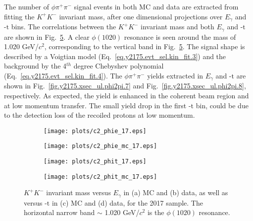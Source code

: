 The number of $\phi \pi^{+} \pi^{-}$ signal events in both MC and data are extracted from fitting the $K^+K^-$ invariant mass, after one dimensional projections over $E_{\gamma}$ and $\mbox{-t}$ bins. The correlations between the $K^+K^-$ invariant mass and both $E_{\gamma}$ and $\mbox{-t}$ are shown in Fig.~\ref{fig.y2175.xsec_ul.phi2pi.2}. A clear $\phi(1020)$ resonance is seen around the mass of 1.020 GeV/$c^2$, corresponding to the vertical band in Fig.~\ref{fig.y2175.xsec_ul.phi2pi.2}. The signal shape is described by a Voigtian model (Eq.~\ref{eq.y2175.evt_sel.kin_fit.3}) and the background by the 4$^{th}$ degree Chebyshev polynomial (Eq.~\ref{eq.y2175.evt_sel.kin_fit.4}). The $\phi \pi^{+} \pi^{-}$ yields extracted in $E_{\gamma}$ and $\mbox{-t}$ are shown in Fig.~\ref{fig.y2175.xsec_ul.phi2pi.7} and Fig.~\ref{fig.y2175.xsec_ul.phi2pi.8}, respectively. As expected, the yield is enhanced in the coherent beam region and at low momentum transfer. The small yield drop in the first $\mbox{-t}$ bin, could be due to the detection loss of the recoiled protons at low momentum. 

\begin{figure}[H]
    \centering
    \begin{subfigure}[b]{0.5\textwidth}
        \texttt{[image: plots/c2\_phie\_17.eps]}
        \caption{}
        \label{fig.y2175.xsec_ul.phi2pi.2.a}
    \end{subfigure}\hfill
    \begin{subfigure}[b]{0.5\textwidth}
        \texttt{[image: plots/c2\_phie\_mc\_17.eps]}
        \caption{}
        \label{fig.y2175.xsec_ul.phi2pi.2.b}
    \end{subfigure}
    \begin{subfigure}[b]{0.5\textwidth}
        \texttt{[image: plots/c2\_phit\_17.eps]}
        \caption{}
        \label{fig.y2175.xsec_ul.phi2pi.2.c}
    \end{subfigure}\hfill
    \begin{subfigure}[b]{0.5\textwidth}
        \texttt{[image: plots/c2\_phit\_mc\_17.eps]}
        \caption{}
        \label{fig.y2175.xsec_ul.phi2pi.2.d}
    \end{subfigure}
    \caption{\label{fig.y2175.xsec_ul.phi2pi.2}$K^{+}K^{-}$ invariant mass versus $E_{\gamma}$ in (a) MC and (b) data, as well as versus $\mbox{-t}$ in (c) MC and (d) data, for the 2017 sample. The horizontal narrow band $\sim$ 1.020 GeV/$c^2$ is the $\phi(1020)$ resonance.}
\end{figure}

